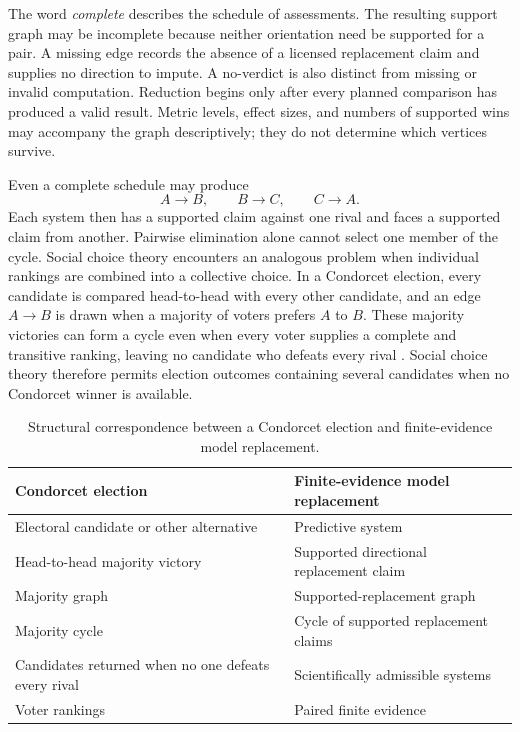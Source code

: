 \documentclass[11pt]{article}
\theoremstyle{remark}
\begin{document}
The word \emph{complete} describes the schedule of assessments. The resulting
support graph may be incomplete because neither orientation need be supported
for a pair. A missing edge records the absence of a licensed replacement
claim and supplies no direction to impute. A no-verdict is also distinct from
missing or invalid computation. Reduction begins only after every planned
comparison has produced a valid result. Metric levels, effect sizes, and
numbers of supported wins may accompany the graph descriptively; they do not
determine which vertices survive.

Even a complete schedule may produce
\[
A\longrightarrow B,\qquad B\longrightarrow C,\qquad
C\longrightarrow A.
\]
Each system then has a supported claim against one rival and faces a supported
claim from another. Pairwise elimination alone cannot select one member of the
cycle. Social choice theory encounters an analogous problem when individual
rankings are combined into a collective choice. In a Condorcet election,
every candidate is compared head-to-head with every other candidate, and an
edge $A\to B$ is drawn when a majority of voters prefers $A$ to $B$. These
majority victories can form a cycle even when every voter supplies a complete
and transitive ranking, leaving no candidate who defeats every rival
\cite{brandt2016computational}. Social choice theory therefore permits
election outcomes containing several candidates when no Condorcet winner is
available.

\begin{table}[H]
\centering
\caption{Structural correspondence between a Condorcet election and
finite-evidence model replacement.}
\label{tab:round-robin-analogy}
\small
\begin{tabularx}{\textwidth}{@{}>{\raggedright\arraybackslash}p{}>{\raggedright\arraybackslash}X@{}}
\toprule
Condorcet election & Finite-evidence model replacement \\
\midrule
Electoral candidate or other alternative & Predictive system \\
Head-to-head majority victory & Supported directional replacement claim \\
Majority graph & Supported-replacement graph \\
Majority cycle & Cycle of supported replacement claims \\
Candidates returned when no one defeats every rival & Scientifically admissible systems \\
Voter rankings & Paired finite evidence \\
\bottomrule
\end{tabularx}
\end{table}
\end{document}
